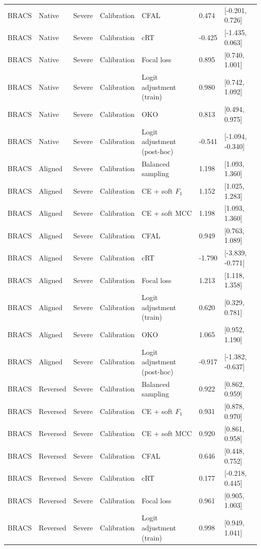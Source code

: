 \begin{longtable}{lllllll}
BRACS & Native & Severe & Calibration & CFAL & 0.474 & [-0.201, 0.726] \\
BRACS & Native & Severe & Calibration & cRT & -0.425 & [-1.435, 0.063] \\
BRACS & Native & Severe & Calibration & Focal loss & 0.895 & [0.740, 1.001] \\
BRACS & Native & Severe & Calibration & Logit adjustment (train) & 0.980 & [0.742, 1.092] \\
BRACS & Native & Severe & Calibration & OKO & 0.813 & [0.494, 0.975] \\
BRACS & Native & Severe & Calibration & Logit adjustment (post-hoc) & -0.541 & [-1.094, -0.340] \\
BRACS & Aligned & Severe & Calibration & Balanced sampling & 1.198 & [1.093, 1.360] \\
BRACS & Aligned & Severe & Calibration & CE + soft $F_1$ & 1.152 & [1.025, 1.283] \\
BRACS & Aligned & Severe & Calibration & CE + soft MCC & 1.198 & [1.093, 1.360] \\
BRACS & Aligned & Severe & Calibration & CFAL & 0.949 & [0.763, 1.089] \\
BRACS & Aligned & Severe & Calibration & cRT & -1.790 & [-3.839, -0.771] \\
BRACS & Aligned & Severe & Calibration & Focal loss & 1.213 & [1.118, 1.358] \\
BRACS & Aligned & Severe & Calibration & Logit adjustment (train) & 0.620 & [0.329, 0.781] \\
BRACS & Aligned & Severe & Calibration & OKO & 1.065 & [0.952, 1.190] \\
BRACS & Aligned & Severe & Calibration & Logit adjustment (post-hoc) & -0.917 & [-1.382, -0.637] \\
BRACS & Reversed & Severe & Calibration & Balanced sampling & 0.922 & [0.862, 0.959] \\
BRACS & Reversed & Severe & Calibration & CE + soft $F_1$ & 0.931 & [0.878, 0.970] \\
BRACS & Reversed & Severe & Calibration & CE + soft MCC & 0.920 & [0.861, 0.958] \\
BRACS & Reversed & Severe & Calibration & CFAL & 0.646 & [0.448, 0.752] \\
BRACS & Reversed & Severe & Calibration & cRT & 0.177 & [-0.218, 0.445] \\
BRACS & Reversed & Severe & Calibration & Focal loss & 0.961 & [0.905, 1.003] \\
BRACS & Reversed & Severe & Calibration & Logit adjustment (train) & 0.998 & [0.949, 1.041] \\

\end{longtable}
